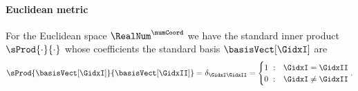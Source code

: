 \paragraph{Euclidean metric}
For the Euclidean space $\RealNum^\numCoord$ we have the standard inner product $\sProd{\cdot}{\cdot}$ whose coefficients \wrt the standard basis $\basisVect[\GidxI]$ are
\begin{align}
 \sProd{\basisVect[\GidxI]}{\basisVect[\GidxII]} = \delta_{\GidxI\GidxII} = \begin{cases} 1 \ : & \GidxI = \GidxII \\ 0 \ : & \GidxI \neq \GidxII \end{cases}
 .
\end{align}
